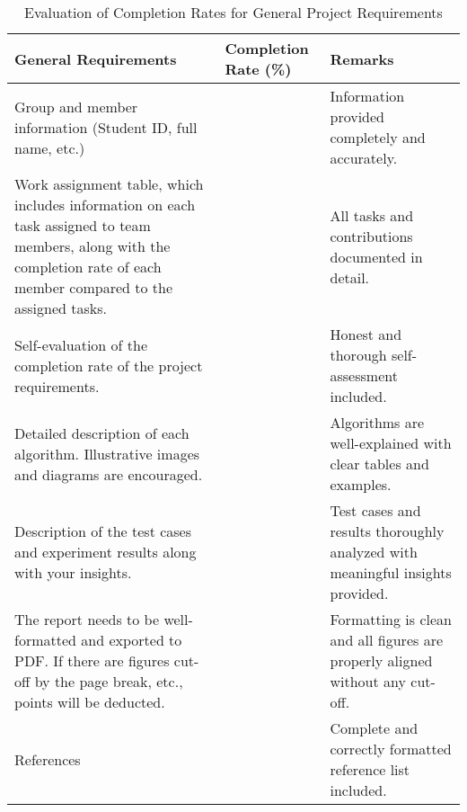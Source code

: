 \begin{longtable}{|>{\raggedright\arraybackslash}p{8.5cm}|>{\centering\arraybackslash}p{2.5cm}|>{\raggedright\arraybackslash}p{4cm}|}

\caption{Evaluation of Completion Rates for General Project Requirements}


\hline
\textbf{General Requirements} & \textbf{Completion Rate (\%)} & \textbf{Remarks} \\ \hline
\endhead
Group and member information (Student ID, full name, etc.) & 100 & Information provided completely and accurately. \\ \hline
Work assignment table, which includes information on each task assigned to team members, along with the completion rate of each member compared to the assigned tasks. & 100 & All tasks and contributions documented in detail. \\ \hline
Self-evaluation of the completion rate of the project requirements. & 100 & Honest and thorough self-assessment included. \\ \hline
Detailed description of each algorithm. Illustrative images and diagrams are encouraged. & 100 & Algorithms are well-explained with clear tables and examples. \\ \hline
Description of the test cases and experiment results along with your insights. & 100 & Test cases and results thoroughly analyzed with meaningful insights provided. \\ \hline
The report needs to be well-formatted and exported to PDF. If there are figures cut-off by the page break, etc., points will be deducted. & 100 & Formatting is clean and all figures are properly aligned without any cut-off. \\ \hline
References & 100 & Complete and correctly formatted reference list included. \\ \hline
\end{longtable}

\newpage


